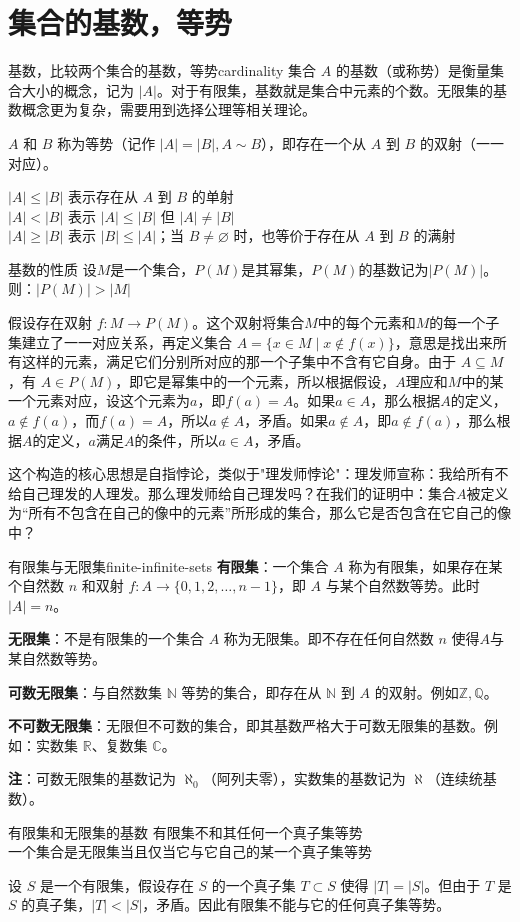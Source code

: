 \section{集合的基数，等势}
\begin{definition}{基数，比较两个集合的基数，等势}{cardinality}
集合 $A$ 的基数（或称势）是衡量集合大小的概念，记为 $|A|$。对于有限集，基数就是集合中元素的个数。无限集的基数概念更为复杂，需要用到选择公理等相关理论。

$A$ 和 $B$ 称为等势（记作 $|A| = |B|,A\sim B$），即存在一个从 $A$ 到 $B$ 的双射（一一对应）。

$|A| \leqslant |B|$ 表示存在从 $A$ 到 $B$ 的单射\\
$|A| < |B|$ 表示 $|A| \leqslant |B|$ 但 $|A| \neq |B|$\\
$|A| \geqslant |B|$ 表示 $|B| \leqslant |A|$；当 $B\ne\varnothing$ 时，也等价于存在从 $A$ 到 $B$ 的满射
\end{definition}
\begin{theorem}{基数的性质}{}
设$M$是一个集合，$P(M)$是其幂集，$P(M)$的基数记为$|P(M)|$。则：$|P(M)|>|M|$
\end{theorem}
假设存在双射 $f: M \to P(M)$。这个双射将集合$M$中的每个元素和$M$的每一个子集建立了一一对应关系，再定义集合 $A = \{ x \in M \mid x \notin f(x) \}$，意思是找出来所有这样的元素，满足它们分别所对应的那一个子集中不含有它自身。由于 $A \subseteq M$，有 $A \in P(M)$，即它是幂集中的一个元素，所以根据假设，$A$理应和$M$中的某一个元素对应，设这个元素为$a$，即$f(a) = A$。如果$a \in A$，那么根据$A$的定义，$a \notin f(a)$，而$f(a) = A$，所以$a \notin A$，矛盾。如果$a \notin A$，即$a \notin f(a)$，那么根据$A$的定义，$a$满足$A$的条件，所以$a \in A$，矛盾。

这个构造的核心思想是自指悖论，类似于"理发师悖论"：理发师宣称：我给所有不给自己理发的人理发。那么理发师给自己理发吗？在我们的证明中：集合$A$被定义为“所有不包含在自己的像中的元素”所形成的集合，那么它是否包含在它自己的像中？
\begin{definition}{有限集与无限集}{finite-infinite-sets}
\textbf{有限集}：一个集合 $A$ 称为有限集，如果存在某个自然数 $n$ 和双射 $f: A \to \{0, 1, 2, \dots, n-1\}$，即 $A$ 与某个自然数等势。此时 $|A| = n$。

\textbf{无限集}：不是有限集的一个集合 $A$ 称为无限集。即不存在任何自然数 $n$ 使得$A$与某自然数等势。

\textbf{可数无限集}：与自然数集 $\mathbb{N}$ 等势的集合，即存在从 $\mathbb{N}$ 到 $A$ 的双射。例如$\mathbb{Z},\mathbb{Q}$。

\textbf{不可数无限集}：无限但不可数的集合，即其基数严格大于可数无限集的基数。例如：实数集 $\mathbb{R}$、复数集 $\mathbb{C}$。

\textbf{注}：可数无限集的基数记为 $\aleph_0$（阿列夫零），实数集的基数记为 $\aleph$（连续统基数）。
\end{definition}
\begin{theorem}{有限集和无限集的基数}{}
    有限集不和其任何一个真子集等势\\一个集合是无限集当且仅当它与它自己的某一个真子集等势
\end{theorem}
设 $S$ 是一个有限集，假设存在 $S$ 的一个真子集 $T \subset S$ 使得 $|T| = |S|$。但由于 $T$ 是 $S$ 的真子集，$|T| < |S|$，矛盾。因此有限集不能与它的任何真子集等势。

